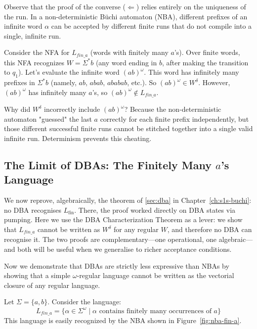 \begin{formaldetails}
Observe that the proof of the converse ($\Longleftarrow$) relies entirely on the uniqueness of the run. In a non-deterministic Büchi automaton (NBA), different prefixes of an infinite word $\alpha$ can be accepted by different finite runs that do not compile into a single, infinite run.

Consider the NFA for $L_{fin\_a}$ (words with finitely many $a$'s). Over finite words, this NFA recognizes $W = \Sigma^* b$ (any word ending in $b$, after making the transition to $q_1$). Let's evaluate the infinite word $(ab)^\omega$. This word has infinitely many prefixes in $\Sigma^* b$ (namely, $ab$, $abab$, $ababab$, etc.). So $(ab)^\omega \in W^\delta$. However, $(ab)^\omega$ has infinitely many $a$'s, so $(ab)^\omega \notin L_{fin\_a}$.

Why did $W^\delta$ incorrectly include $(ab)^\omega$? Because the non-deterministic automaton "guessed" the last $a$ correctly for each finite prefix independently, but those different successful finite runs cannot be stitched together into a single valid infinite run. Determinism prevents this cheating.
\end{formaldetails}

\subsection{The Limit of DBAs: The Finitely Many $a$'s Language}
\label{subsec:fin-a-limit}

We now reprove, algebraically, the theorem of \cref{sec:dba} in Chapter~\ref{ch:s1s-buchi}: no DBA recognises $L_{\mathrm{fin}}$. There, the proof worked directly on DBA states via pumping. Here we use the DBA Characterization Theorem as a lever: we show that $L_{fin\_a}$ cannot be written as $W^\delta$ for any regular $W$, and therefore no DBA can recognise it. The two proofs are complementary---one operational, one algebraic---and both will be useful when we generalise to richer acceptance conditions.

Now we demonstrate that DBAs are strictly less expressive than NBAs by showing that a simple $\omega$-regular language cannot be written as the vectorial closure of any regular language.

Let $\Sigma = \{a, b\}$. Consider the language:
$$L_{fin\_a} = \{ \alpha \in \Sigma^\omega \mid \alpha \text{ contains finitely many occurrences of } a \}$$
This language is easily recognized by the NBA shown in Figure~\ref{fig:nba-fin-a}.

